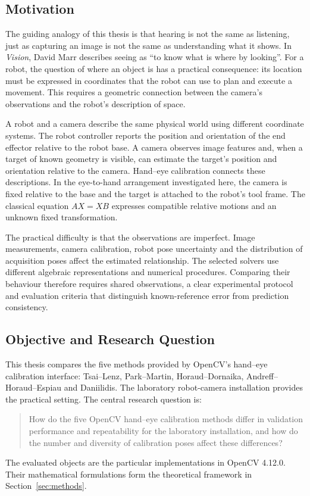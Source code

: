 \documentclass[12pt,a4paper]{article}
\begin{document}
\subsection{Motivation}
The guiding analogy of this thesis is that hearing is not the same as listening, just as capturing an image is not the same as understanding what it shows. In \emph{Vision}, David Marr describes seeing as \enquote{to know what is where by looking}. \cite{marr2010} For a robot, the question of where an object is has a practical consequence: its location must be expressed in coordinates that the robot can use to plan and execute a movement. This requires a geometric connection between the camera's observations and the robot's description of space.

A robot and a camera describe the same physical world using different coordinate systems. The robot controller reports the position and orientation of the end effector relative to the robot base. A camera observes image features and, when a target of known geometry is visible, can estimate the target's position and orientation relative to the camera. Hand--eye calibration connects these descriptions. In the eye-to-hand arrangement investigated here, the camera is fixed relative to the base and the target is attached to the robot's tool frame. The classical equation $AX=XB$ expresses compatible relative motions and an unknown fixed transformation. \cite{tsai,halconde,wenhardtde}

The practical difficulty is that the observations are imperfect. Image measurements, camera calibration, robot pose uncertainty and the distribution of acquisition poses affect the estimated relationship. The selected solvers use different algebraic representations and numerical procedures. Comparing their behaviour therefore requires shared observations, a clear experimental protocol and evaluation criteria that distinguish known-reference error from prediction consistency. \cite{eauncertainty,opencvsource}

\subsection{Objective and Research Question}
This thesis compares the five methods provided by OpenCV's hand--eye calibration interface: Tsai--Lenz, Park--Martin, Horaud--Dornaika, Andreff--Horaud--Espiau and Daniilidis. The laboratory robot-camera installation provides the practical setting. The central research question is:
\begin{quote}
How do the five OpenCV hand--eye calibration methods differ in validation performance and repeatability for the laboratory installation, and how do the number and diversity of calibration poses affect these differences?
\end{quote}
The evaluated objects are the particular implementations in OpenCV 4.12.0. Their mathematical formulations form the theoretical framework in Section~\ref{sec:methods}. \cite{opencv,opencvsource}
\end{document}
